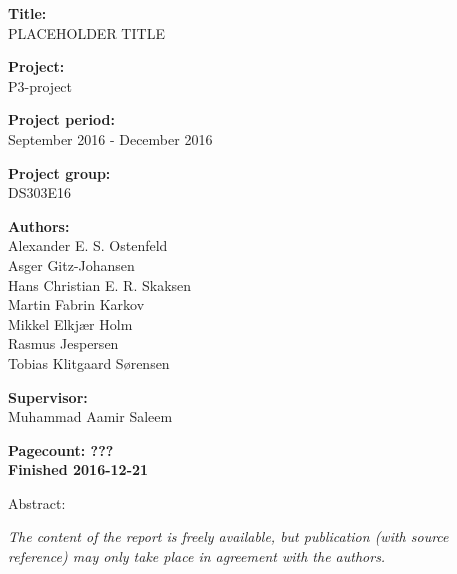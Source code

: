 \begin{minipage}[t]{0.48\textwidth}
\textbf{Title:} \\[5pt]\bigskip\hspace{2ex}
PLACEHOLDER TITLE

\textbf{Project:} \\[5pt]\bigskip\hspace{2ex}
P3-project

\textbf{Project period:} \\[5pt]\bigskip\hspace{2ex}
September 2016 - December 2016

\textbf{Project group:} \\[5pt]\bigskip\hspace{2ex}
DS303E16

\textbf{Authors:} \\[5pt]\hspace*{2ex}
Alexander E. S. Ostenfeld \\\hspace*{2ex}
Asger Gitz-Johansen \\\hspace*{2ex}
Hans Christian E. R. Skaksen \\\hspace*{2ex}
Martin Fabrin Karkov \\\hspace*{2ex}
Mikkel Elkjær Holm \\\hspace*{2ex}
Rasmus Jespersen \\\bigskip\hspace*{2ex}
Tobias Klitgaard Sørensen

\textbf{Supervisor:} \\[5pt]\hspace*{2ex}
Muhammad Aamir Saleem

\vspace*{1cm}

\textbf{Pagecount: ???} \\
\textbf{Finished 2016-12-21}

\end{minipage}
\hfill
\begin{minipage}[t]{0.483\textwidth}
Abstract: \\[5pt]
\fbox{\parbox{7cm}{\bigskip\bigskip}}
\end{minipage}

\vfill

{\footnotesize\itshape The content of the report is freely available, but publication (with source reference) may only take place in agreement with the authors.}

